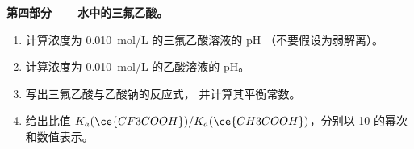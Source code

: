 \begin{problem}
\medskip
\noindent\textbf{第四部分——水中的三氟乙酸。}
\begin{enumerate}[resume]
  \item 计算浓度为 \qty{0.010}{mol/L} 的三氟乙酸溶液的 pH
        （不要假设为弱解离）。
  \item 计算浓度为 \qty{0.010}{mol/L} 的乙酸溶液的 pH。
  \item 写出三氟乙酸与乙酸钠的反应式，
        并计算其平衡常数。
  \item 给出比值 $K_a(\ce{CF3COOH})/K_a(\ce{CH3COOH})$，分别以
        10 的幂次和数值表示。
\end{enumerate}
\end{problem}
